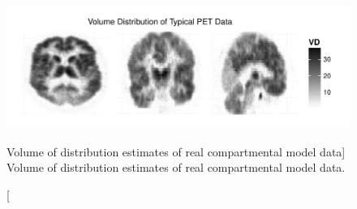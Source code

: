 \begin{figure}[t]
  \UseAltLinespread
  \includegraphics[width=\linewidth]{fig_src/PETPlot-smc2-ps-bw}
  \caption
  [Volume of distribution estimates of real \protect\pet
   compartmental model data]
  {Volume of distribution estimates of real \protect\pet
   compartmental model data.}
  \label{fig:petplot}
\end{figure}
